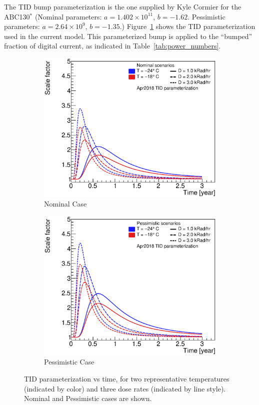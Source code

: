 The TID bump parameterization is the one supplied by Kyle Cormier for the ABC130$^{*}$
(Nominal parameters: $a=1.402\times 10^{11}$, $b=-1.62$.
Pessimistic parameters: $a=2.64\times10^{9}$, $b=-1.35$.)
Figure~\ref{tid_parameterization} shows the TID parameterization used in the current model. This
parameterized bump is applied to the ``bumped'' fraction of digital current, as indicated in
Table~\ref{tab:power_numbers}.

\begin{figure}[ht!]
\begin{center}
\begin{subfigure}[t]{0.49\textwidth}\includegraphics[width=0.99\linewidth]{figures/AbcTidBumpVersionRatesAndTemps_Nominal}\caption{Nominal Case}\end{subfigure}
\begin{subfigure}[t]{0.49\textwidth}\includegraphics[width=0.99\linewidth]{figures/AbcTidBumpVersionRatesAndTemps_Pessimistic}\caption{Pessimistic Case}\end{subfigure}
\end{center}
\caption{TID parameterization vs time, for two representative temperatures (indicated by
color) and three dose rates (indicated by line style). Nominal and Pessimistic cases are shown.}
\label{tid_parameterization}
\end{figure}

